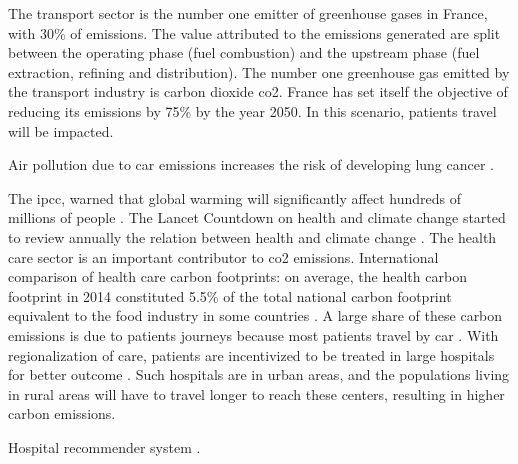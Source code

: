 \cite{charlton_challenges_2015}
\cite{sabesan_timely_2014}
\cite{dasgupta_variations_2018}
\cite{hall_unequal_2004}

\cite{sabesan_are_2014}
\cite{sabesan_telemedicine_2012}
\cite{sabesan_timely_2014}
\cite{sabesan_medical_2014}
\cite{mooi_teleoncology_2012}
\cite{bertucci_outpatient_2019}

The transport sector is the number one emitter of greenhouse gases in France, with 30\% of emissions. The value attributed to the emissions generated are split between the operating phase (fuel combustion) and the upstream phase (fuel extraction, refining and distribution). The number one greenhouse gas emitted by the transport industry is carbon dioxide \ac{co2}.
France has set itself the objective of reducing its emissions by 75\% by the year 2050. In this scenario, patients travel will be impacted.

Air pollution due to car emissions increases the risk of developing lung cancer \cite{raaschou-nielsen_air_2013}.

The \ac{ipcc}, warned that global warming will significantly affect hundreds of millions of people \cite{change_climate_2015}.
The Lancet Countdown on health and climate change started to review annually the relation between health and climate change \cite{watts_2020_2021}.
The health care sector is an important contributor to \ac{co2} emissions. International comparison of health care carbon footprints: on average, the health carbon footprint in 2014 constituted 5.5\% of the total national carbon footprint equivalent to the food industry in some countries \cite{pichler_international_2019}.
A large share of these carbon emissions is due to patients journeys \cite{andrews_carbon_2013,nicolet_what_2022} because most patients travel by car \cite{forner_carbon_2021}. With regionalization of care, patients are incentivized to be treated in large hospitals for better outcome \cite{eskander_health_2016}. Such hospitals are in urban areas, and the populations living in rural areas will have to travel longer to reach these centers, resulting in higher carbon emissions.

\cite{guillon_empreinte_2020}
\cite{health_care_without_harm_hcwh_global_2021}
\cite{the_shift_project_plan_2021}

Hospital recommender system \cite{zhang_idoctor_2017,han_hybrid_2018,narducci_recommender_2015,hoens_reliable_2010,tran_recommender_2021}.

